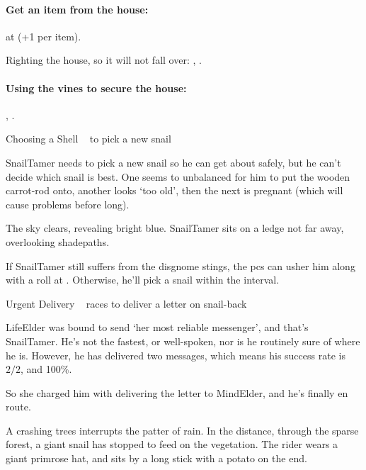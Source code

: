 \paragraph{Get an item from the house:}
 at \tn[12] (+1 per item).

Righting the house, so it will not fall over:
, \tn[12].

\paragraph{Using the vines to secure the house:}
, \tn[10].


{Choosing a Shell}%
{~ to pick a new snail}%

\Gls{SnailTamer} needs to pick a new snail so he can get about safely, but he can't decide which snail is best.
One seems to unbalanced for him to put the wooden carrot-rod onto, another looks `too old', then the next is pregnant (which will cause problems before long).

\begin{boxtext}
  The sky clears, revealing bright blue.
  \Gls{SnailTamer} sits on a ledge not far away, overlooking \gls{shadepaths}.
\end{boxtext}

If \gls{SnailTamer} still suffers from the \gls{disgnome} stings,
the \glspl{pc} can usher him along with a  roll at \tn[10].
Otherwise, he'll pick a snail within the \gls{interval}.

{Urgent Delivery}%
{~ races to deliver a letter on snail-back}%

\Gls{LifeElder} was bound to send `her most reliable messenger', and that's \gls{SnailTamer}.
He's not the fastest, or well-spoken, nor is he routinely sure of where he is.
However, he has delivered two messages, which means his success rate is $2/2$, and 100\%.

So she charged him with delivering the letter to \gls{MindElder}, and he's finally en route.

\begin{boxtext}
  A crashing trees interrupts the patter of rain.
  In the distance, through the sparse forest, a giant snail has stopped to feed on the vegetation.
  The rider wears a giant primrose hat, and sits by a long stick with a potato on the end.
\end{boxtext}

